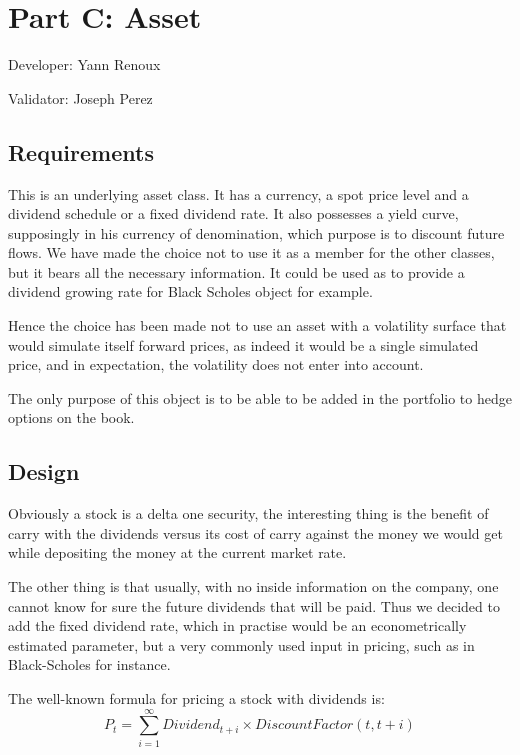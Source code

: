 \chapter{Part C: Asset}
Developer: Yann Renoux

\noindent Validator: Joseph Perez



\section{Requirements}

\par This is an underlying asset class. It has a currency, a spot price level and a dividend
 schedule or a fixed dividend rate. It also possesses a yield curve, supposingly in his currency of denomination, which purpose is to discount future flows. We have made the choice not to use it as a member for the other classes, but it bears all the necessary information. It could be used as to provide a dividend growing rate for Black Scholes object for example.

Hence the choice has been made not to use an asset with a volatility surface that would simulate itself forward prices, as indeed it would be a single simulated price, and in expectation, the volatility does not enter into account.

The only purpose of this object is to be able to be added in the portfolio to hedge options on the book.

\section{Design }

\par Obviously a stock is a delta one security, the interesting thing is the benefit of carry with the dividends versus its cost of carry against the money we would get while depositing the money at the current market rate.

The other thing is that usually, with no inside information on the company, one cannot know for sure the future dividends that will be paid. Thus we decided to add the fixed dividend rate, which in practise would be an econometrically estimated parameter, but a very commonly used input in pricing, such as in Black-Scholes for instance.

The well-known formula for pricing a stock with dividends is:
\[
P_t=\sum_{i=1}^\infty Dividend_{t+i}\times DiscountFactor(t,t+i)
\]

